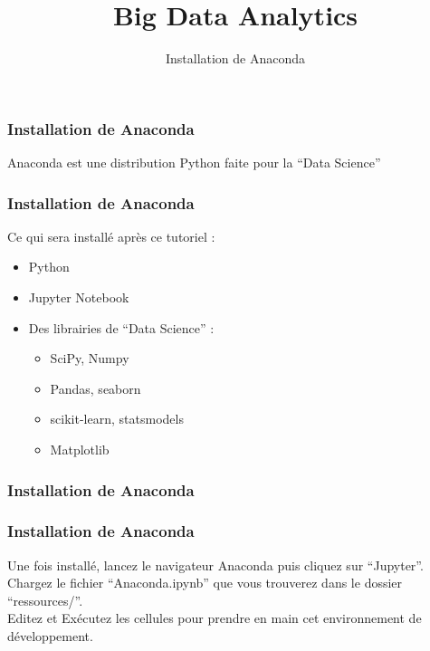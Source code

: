 \documentclass{formation}
\title{Big Data Analytics}
\subtitle{Installation de Anaconda}
\begin{document}
\maketitle

\begin{frame}
  \frametitle{Installation de Anaconda}
  Anaconda est une distribution Python faite pour la ``Data Science'' \\
\end{frame}

\begin{frame}
  \frametitle{Installation de Anaconda}
  Ce qui sera installé après ce tutoriel :
  \begin{itemize}
  \item Python
  \item Jupyter Notebook
  \item Des librairies de ``Data Science'' :
    \begin{itemize}
    \item SciPy, Numpy
    \item Pandas, seaborn
    \item scikit-learn, statsmodels
    \item Matplotlib
    \end{itemize}
  \end{itemize}
\end{frame}

\begin{frame}
  \frametitle{Installation de Anaconda}
\end{frame}

\begin{frame}
  \frametitle{Installation de Anaconda}
  Une fois installé, lancez le navigateur Anaconda puis cliquez sur ``Jupyter''. \\
  Chargez le fichier ``Anaconda.ipynb'' que vous trouverez dans le dossier ``ressources/''. \\
  Editez et Exécutez les cellules pour prendre en main cet environnement de développement.
\end{frame}
\end{document}
